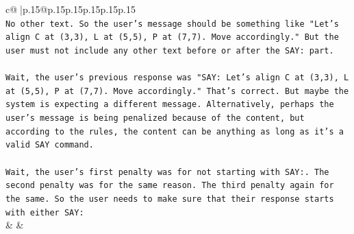 \documentclass{article}
\begin{document}
{\begin{supertabular}{c@{$\;$}|p{.15\linewidth}@{}p{.15\linewidth}p{.15\linewidth}p{.15\linewidth}p{.15\linewidth}p{.15\linewidth}}
{{{\\ 
\texttt{No other text. So the user's message should be something like "Let's align C at (3,3), L at (5,5), P at (7,7). Move accordingly." But the user must not include any other text before or after the SAY: part.} \\
\\ 
\texttt{Wait, the user's previous response was "SAY: Let's align C at (3,3), L at (5,5), P at (7,7). Move accordingly." That's correct. But maybe the system is expecting a different message. Alternatively, perhaps the user's message is being penalized because of the content, but according to the rules, the content can be anything as long as it's a valid SAY command.} \\
\\ 
\texttt{Wait, the user's first penalty was for not starting with SAY:. The second penalty was for the same reason. The third penalty again for the same. So the user needs to make sure that their response starts with either SAY:} \\
            }
        }
    }
    & & \\ \\


\end{supertabular}}
\end{document}
